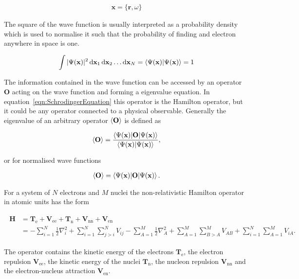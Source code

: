 \begin{align}
	\mathbf{x}=\{\mathbf{r},\omega\}
\end{align}

The square of the wave function is usually interpreted as a probability density
which is used to normalise it such that the probability of finding and electron
anywhere in space is one.

\begin{align}
	\int |\Psi(\mathbf{x})|^2\dif \mathbf{x}_1\dif \mathbf{x}_2\ldots\dif \mathbf{x}_N=\braket{\Psi(\mathbf{x})|\Psi(\mathbf{x})}=1
\end{align}

The information contained in the wave function can be accessed by an operator
$\mathbf{O}$ acting on the wave function and forming a eigenvalue equation. In
equation~\eqref{eqn:SchrodingerEquation} this operator is the Hamilton
operator, but it could be any operator connected to a physical observable.
Generally the eigenvalue of an arbitrary operator $\braket{\mathbf{O}}$ is
defined as

\begin{equation}
	\braket{\mathbf{O}}=\frac{\braket{\Psi(\mathbf{x})|\mathbf{O}|\Psi(\mathbf{x})}}{\braket{\Psi(\mathbf{x})|\Psi(\mathbf{x})}},
\end{equation}

or for normalised wave functions

\begin{align}
	\braket{\mathbf{O}}=\braket{\Psi(\mathbf{x})|\mathbf{O}|\Psi(\mathbf{x})}.
\end{align}

For a system of $N$ electrons and $M$ nuclei the non-relativistic Hamilton
operator in atomic units has the form

\begin{align}
\begin{aligned}
    \mathbf{H}&=\mathbf{T}_\text{e} + \mathbf{V}_\text{ee} + \mathbf{T}_\text{n} + \mathbf{V}_\text{nn} + \mathbf{V}_\text{en} \\
    &=-\sum_{i=1}^N\frac{1}{2}\nabla_i^2
    + \sum_{i=1}^N\sum_{j>i}^NV_{ij}
    - \sum_{A=1}^M\frac{1}{2}\nabla_A^2
    + \sum_{A=1}^M\sum_{B>A}^MV_{AB}
    + \sum_{i=1}^N\sum_{A=1}^MV_{iA}.\label{eqn:hamiltonoperator}
\end{aligned}
\end{align}

The operator contains the kinetic energy of the electrons
$\mathbf{T}_\text{e}$, the electron repulsion $\mathbf{V}_\text{ee}$, the
kinetic energy of the nuclei $\mathbf{T}_\text{n}$, the nucleon repulsion
$\mathbf{V}_\text{nn}$ and the electron-nucleus attraction
$\mathbf{V}_\text{en}$.

